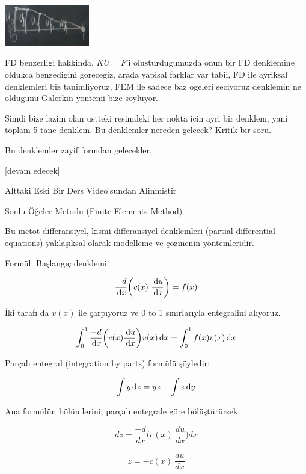 \documentclass[12pt,fleqn]{article}\usepackage{../../common}
\begin{document}
\includegraphics[width=10em]{compscieng_1_18_04.png}

FD benzerligi hakkinda, $KU=F$'i olusturdugumuzda onun bir FD denklemine oldukca
benzedigini gorecegiz, arada yapisal farklar var tabii, FD ile ayriksal
denklemleri biz tanimliyoruz, FEM ile sadece baz ogeleri seciyoruz denklemin
ne oldugunu Galerkin yontemi bize soyluyor.

Simdi bize lazim olan ustteki resimdeki her nokta icin ayri bir denklem, yani
toplam 5 tane denklem. Bu denklemler nereden gelecek? Kritik bir soru.

Bu denklemler zayif formdan gelecekler. 




















[devam edecek]

Alttaki Eski Bir Ders Video'sundan Alinmistir

Sonlu Öğeler Metodu (Finite Elements Method)

Bu metot differansiyel, kısmi differansiyel denklemleri (partial differential
equations) yaklaşıksal olarak modelleme ve çözmenin yöntemleridir.

Formül: Başlangıç denklemi

$$ \frac{-d}{\,\mathrm{d} x} \bigg( c(x) \ \frac{\,\mathrm{d} u}{\,\mathrm{d} x} \bigg) = f(x) $$

İki tarafı da  $v(x)$ ile çarpıyoruz ve 0 to 1 sınırlarıyla entegralini alıyoruz.

$$
\int_0^1 \frac{-d}{\,\mathrm{d} x} \bigg( c(x) \frac{\,\mathrm{d} u}{\,\mathrm{d} x} \bigg) v(x)\,\mathrm{d} x
= \int_0^1 f(x)v(x) \,\mathrm{d} x
$$

Parçalı entegral (integration by parts) formülü şöyledir:

$$ \int y \,\mathrm{d} z = y  z - \int z \,\mathrm{d} y $$

Ana formülün bölümlerini, parçalı entegrale göre bölüştürürsek:

$$ dz = \frac{-d}{dx} \bigg( c(x) \ \frac{du}{dx} \bigg) dx  $$

$$ z = - c(x) \ \frac{du}{dx}  $$
\end{document}
